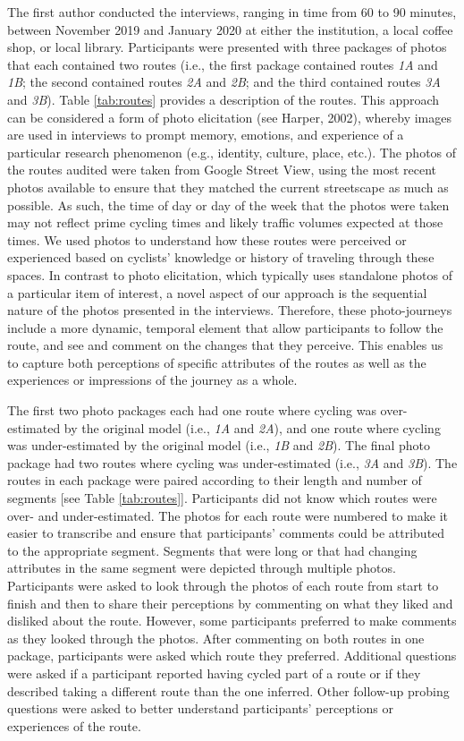 \documentclass[]{elsarticle} %
\begin{document}
The first author conducted the interviews, ranging in time from 60 to 90
minutes, between November 2019 and January 2020 at either the
institution, a local coffee shop, or local library. Participants were
presented with three packages of photos that each contained two routes
(i.e., the first package contained routes \emph{1A} and \emph{1B}; the
second contained routes \emph{2A} and \emph{2B}; and the third contained
routes \emph{3A} and \emph{3B}). Table \ref{tab:routes} provides a
description of the routes. This approach can be considered a form of
photo elicitation (see Harper, 2002), whereby images are used in
interviews to prompt memory, emotions, and experience of a particular
research phenomenon (e.g., identity, culture, place, etc.). The photos
of the routes audited were taken from Google Street View, using the most
recent photos available to ensure that they matched the current
streetscape as much as possible. As such, the time of day or day of the
week that the photos were taken may not reflect prime cycling times and
likely traffic volumes expected at those times. We used photos to
understand how these routes were perceived or experienced based on
cyclists' knowledge or history of traveling through these spaces. In
contrast to photo elicitation, which typically uses standalone photos of
a particular item of interest, a novel aspect of our approach is the
sequential nature of the photos presented in the interviews. Therefore,
these photo-journeys include a more dynamic, temporal element that allow
participants to follow the route, and see and comment on the changes
that they perceive. This enables us to capture both perceptions of
specific attributes of the routes as well as the experiences or
impressions of the journey as a whole.

The first two photo packages each had one route where cycling was
over-estimated by the original model (i.e., \emph{1A} and \emph{2A}),
and one route where cycling was under-estimated by the original model
(i.e., \emph{1B} and \emph{2B}). The final photo package had two routes
where cycling was under-estimated (i.e., \emph{3A} and \emph{3B}). The
routes in each package were paired according to their length and number
of segments {[}see Table \ref{tab:routes}{]}. Participants did not know
which routes were over- and under-estimated. The photos for each route
were numbered to make it easier to transcribe and ensure that
participants' comments could be attributed to the appropriate segment.
Segments that were long or that had changing attributes in the same
segment were depicted through multiple photos. Participants were asked
to look through the photos of each route from start to finish and then
to share their perceptions by commenting on what they liked and disliked
about the route. However, some participants preferred to make comments
as they looked through the photos. After commenting on both routes in
one package, participants were asked which route they preferred.
Additional questions were asked if a participant reported having cycled
part of a route or if they described taking a different route than the
one inferred. Other follow-up probing questions were asked to better
understand participants' perceptions or experiences of the route.
\end{document}
